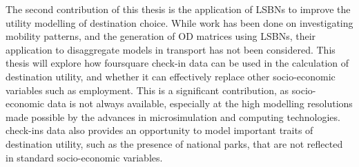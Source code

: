The second contribution of this thesis is the application of LSBNs to improve the utility modelling of destination choice. While work has been done on investigating mobility patterns, and the generation of OD matrices using LSBNs, their application to disaggregate models in transport has not been considered. This thesis will explore how foursquare check-in data can be used in the calculation of destination utility, and whether it can effectively replace other socio-economic variables such as employment. This is a significant contribution, as socio-economic data is not always available, especially at the high modelling resolutions made possible by the advances in microsimulation and computing technologies. check-ins data also provides an opportunity to model important traits of destination utility, such as the presence of national parks, that are not reflected in standard socio-economic variables.

